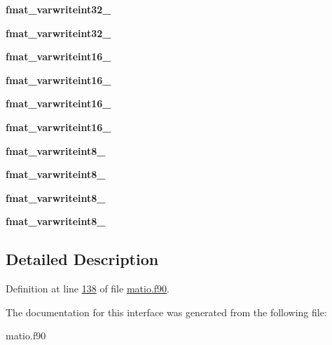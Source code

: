 \begin{DoxyCompactItemize}
\item 
\mbox{\label{interfacematio_1_1fmat__varwrite_a5425a79f5e3dd3e81a237acfbef670f3}} 
{\bfseries fmat\+\_\+varwriteint32\+\_}
\item 
\mbox{\label{interfacematio_1_1fmat__varwrite_a94b737e5f6e97a309c34502d180db461}} 
{\bfseries fmat\+\_\+varwriteint32\+\_}
\item 
\mbox{\label{interfacematio_1_1fmat__varwrite_a121d4d857a7c8f8c59f2d8c408872176}} 
{\bfseries fmat\+\_\+varwriteint16\+\_}
\item 
\mbox{\label{interfacematio_1_1fmat__varwrite_ac56cd05d2ce0d49de80a5e47a8b6af3e}} 
{\bfseries fmat\+\_\+varwriteint16\+\_}
\item 
\mbox{\label{interfacematio_1_1fmat__varwrite_a464278048f9fc582c0cc1b653b7902dc}} 
{\bfseries fmat\+\_\+varwriteint16\+\_}
\item 
\mbox{\label{interfacematio_1_1fmat__varwrite_a7339a0461e353d4c3822a82190cfd170}} 
{\bfseries fmat\+\_\+varwriteint16\+\_}
\item 
\mbox{\label{interfacematio_1_1fmat__varwrite_a86cc51c1d6ca33cbbf7d0c17868e8ec0}} 
{\bfseries fmat\+\_\+varwriteint8\+\_}
\item 
\mbox{\label{interfacematio_1_1fmat__varwrite_aed96d055629ec09f146977112d87047a}} 
{\bfseries fmat\+\_\+varwriteint8\+\_}
\item 
\mbox{\label{interfacematio_1_1fmat__varwrite_acce50d3b500304fa065d7a1a2406f0a9}} 
{\bfseries fmat\+\_\+varwriteint8\+\_}
\item 
\mbox{\label{interfacematio_1_1fmat__varwrite_a4ffcb2fada559fe1dfc5dd3c37dc44b9}} 
{\bfseries fmat\+\_\+varwriteint8\+\_}
\end{DoxyCompactItemize}


\subsection{Detailed Description}


Definition at line \hyperlink{matio_8f90_source_l00138}{138} of file \hyperlink{matio_8f90_source}{matio.\+f90}.



The documentation for this interface was generated from the following file\+:\begin{DoxyCompactItemize}
\item 
matio.\+f90\end{DoxyCompactItemize}
